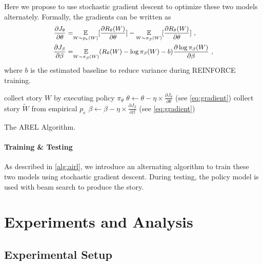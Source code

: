 \documentclass[11pt,a4paper]{article}
\newcommand{\expect}[1]{\ensuremath{\underset{#1}{\mathbb{E}}\xspace}}
\begin{document}
Here we propose to use stochastic gradient descent to optimize these two models alternately. Formally, the gradients can be written as
\begin{align}
\label{eq:gradient}
\small
\begin{split}
\frac{\partial J_{\theta}}{\partial \theta} =& \expect{W \sim p_e(W)}[\frac{\partial R_{\theta}(W)}{\partial \theta}] - \expect{W \sim \pi_{\beta}(W)}[\frac{\partial R_{\theta}(W)}{\partial \theta}] ~,
\\ 
\frac{\partial J_{\beta}}{\partial \beta} =& \expect{W \sim \pi_{\beta}(W)} (R_{\theta}(W) - \log \pi_{\beta}(W) - b) \frac{\partial \log \pi_{\beta}(W)}{\partial \beta} ~,
\end{split}
\end{align}
where $b$ is the estimated baseline to reduce variance during REINFORCE training.

\begin{algorithm}[t]
\begin{algorithmic}[1]
\State collect story $W$ by executing policy $\pi_{\theta}$
\State $\theta \leftarrow \theta - \eta  \times \frac{\partial J_{\theta}}{\partial \theta}$  (see \autoref{eq:gradient})
\State collect story $\tilde{W}$ from empirical $p_e$
\State $\beta \leftarrow \beta - \eta \times \frac{\partial J_{\beta}}{\partial \beta}$ (see \autoref{eq:gradient}) 
\EndIf
\EndFor
\end{algorithmic}
\caption{The AREL Algorithm.}\label{alg:airl}
\end{algorithm}


\paragraph{Training \& Testing} As described in \autoref{alg:airl}, we introduce an alternating algorithm to train these two models using stochastic gradient descent. During testing, the policy model is used with beam search to produce the story.

\section{Experiments and Analysis}

\label{sec:exp}
\subsection{Experimental Setup}
\end{document}
